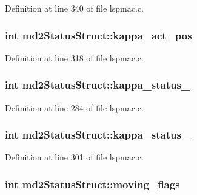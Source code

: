 Definition at line 340 of file lspmac.\-c.

\hypertarget{structmd2StatusStruct_ac384fb7073387dd5dcb2e85a00ec8a77}{
\subsubsection[{kappa\-\_\-act\-\_\-pos}]{\setlength{\rightskip}{0pt plus 5cm}int md2\-Status\-Struct\-::kappa\-\_\-act\-\_\-pos}}\label{structmd2StatusStruct_ac384fb7073387dd5dcb2e85a00ec8a77}


Definition at line 318 of file lspmac.\-c.

\hypertarget{structmd2StatusStruct_ab152694bc32d37c1d180f55e8d282020}{
\subsubsection[{kappa\-\_\-status\-\_\-1}]{\setlength{\rightskip}{0pt plus 5cm}int md2\-Status\-Struct\-::kappa\-\_\-status\-\_}}\label{structmd2StatusStruct_ab152694bc32d37c1d180f55e8d282020}


Definition at line 284 of file lspmac.\-c.

\hypertarget{structmd2StatusStruct_af6891f5f8dcfc62668f64c583042c6bc}{
\subsubsection[{kappa\-\_\-status\-\_\-2}]{\setlength{\rightskip}{0pt plus 5cm}int md2\-Status\-Struct\-::kappa\-\_\-status\-\_}}\label{structmd2StatusStruct_af6891f5f8dcfc62668f64c583042c6bc}


Definition at line 301 of file lspmac.\-c.

\hypertarget{structmd2StatusStruct_aac82f8e97fa39ea9be7823dd1d308986}{
\subsubsection[{moving\-\_\-flags}]{\setlength{\rightskip}{0pt plus 5cm}int md2\-Status\-Struct\-::moving\-\_\-flags}}\label{structmd2StatusStruct_aac82f8e97fa39ea9be7823dd1d308986}


